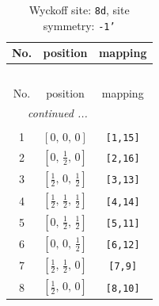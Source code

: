 \documentclass[fleqn,8pt]{jsarticle}
\begin{document}
\begin{longtable}{ccc}
\caption{Wyckoff site: {\tt 8d}, site symmetry: {\tt -1'}}
 \\
 \hline \hline
No. & position & mapping \\ \hline \endfirsthead

\multicolumn{2}{l}{\tablename\ \thetable{}} \\
 \hline \hline
No. & position & mapping \\ \hline \endhead

 \hline \hline
\multicolumn{2}{r}{\footnotesize\it continued ...} \\ \endfoot

 \hline \hline
\multicolumn{2}{r}{} \\ \endlastfoot

1 & $\left[ 0,\, 0,\, 0 \right]$ & {\tt [1,15]} \\ \hline
2 & $\left[ 0,\, \frac{1}{2},\, 0 \right]$ & {\tt [2,16]} \\ \hline
3 & $\left[ \frac{1}{2},\, 0,\, \frac{1}{2} \right]$ & {\tt [3,13]} \\ \hline
4 & $\left[ \frac{1}{2},\, \frac{1}{2},\, \frac{1}{2} \right]$ & {\tt [4,14]} \\ \hline
5 & $\left[ 0,\, \frac{1}{2},\, \frac{1}{2} \right]$ & {\tt [5,11]} \\ \hline
6 & $\left[ 0,\, 0,\, \frac{1}{2} \right]$ & {\tt [6,12]} \\ \hline
7 & $\left[ \frac{1}{2},\, \frac{1}{2},\, 0 \right]$ & {\tt [7,9]} \\ \hline
8 & $\left[ \frac{1}{2},\, 0,\, 0 \right]$ & {\tt [8,10]} \\
\end{longtable}
\renewcommand{\arraystretch}{1.2}
\end{document}
